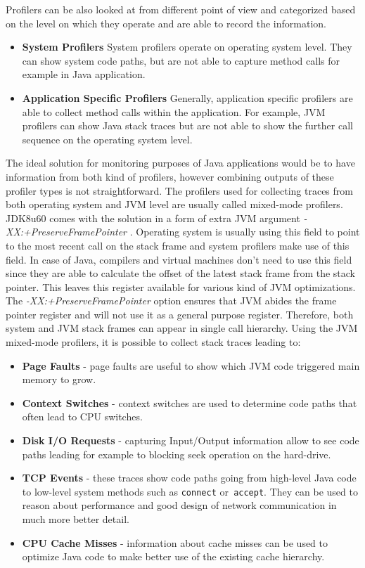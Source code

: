 Profilers can be also looked at from different point of view and categorized based on the level on which they operate and are able to record the information.
\begin{itemize}
	\item \textbf{System Profilers} \newline
	System profilers operate on operating system level. They can show system code paths, but are not able to capture method calls for example in Java application.
	\item \textbf{Application Specific Profilers} \newline
	Generally, application specific profilers are able to collect method calls within the application. For example, JVM profilers can show Java stack traces but are not able to show the further call sequence on the operating system level.

\end{itemize}
The ideal solution for monitoring purposes of Java applications would be to have information from both kind of profilers, however combining outputs of these profiler types is not straightforward. The profilers used for collecting traces from both operating system and JVM level are usually called mixed-mode profilers. JDK8u60 comes with the solution in a form of extra JVM argument \textit{-XX:+PreserveFramePointer} \cite{MixedModeProfilers}. Operating system is usually using this field to point to the most recent call on the stack frame and system profilers make use of this field. In case of Java, compilers and virtual machines don't need to use this field since they are able to calculate the offset of the latest stack frame from the stack pointer. This leaves this register available for various kind of JVM optimizations. The \textit{-XX:+PreserveFramePointer}  option ensures that JVM abides the frame pointer register and will not use it as a general purpose register. Therefore, both system and JVM stack frames can appear in single call hierarchy. Using the JVM mixed-mode profilers, it is possible to collect stack traces leading to:
\begin{itemize}
	\item \textbf{Page Faults} - page faults are useful to show which JVM code triggered main memory to grow.
	\item \textbf{Context Switches} - context switches are used to determine code paths that often lead to CPU switches.
	\item\textbf{Disk I/O Requests} - capturing Input/Output information allow to see code paths leading for example to blocking seek operation on the hard-drive.
	\item \textbf{TCP Events} - these traces show code paths going from high-level Java code to low-level system methods such as \texttt{connect} or\texttt{ accept}. They can be used to reason about performance and good design of network communication in much more better detail.
	\item \textbf{CPU Cache Misses} - information about cache misses can be used to optimize Java code to make better use of the existing cache hierarchy.
\end{itemize}

